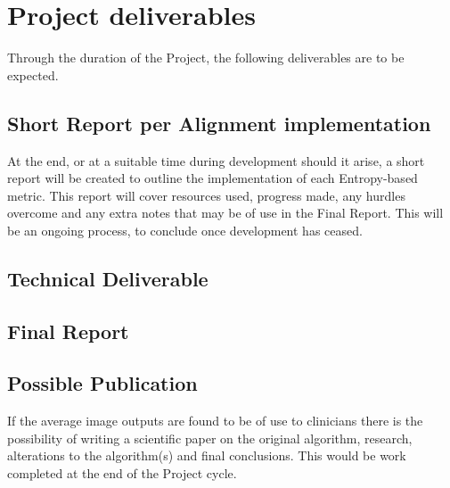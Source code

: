 \documentclass[11pt,fleqn,twoside]{article}
\begin{document}
\section{Project deliverables}
Through the duration of the Project, the following deliverables are to be expected.

\subsection{Short Report per Alignment implementation}
At the end, or at a suitable time during development should it arise, a short report will be created to outline the implementation of each Entropy-based metric. This report will cover resources used, progress made, any hurdles overcome and any extra notes that may be of use in the Final Report. This will be an ongoing process,  to conclude once development has ceased.

\subsection{Technical Deliverable}

\subsection{Final Report}

\subsection{Possible Publication}
If the average image outputs are found to be of use to clinicians there is the possibility of writing a scientific paper on the original algorithm, research, alterations to the algorithm(s) and final conclusions. This would be work completed at the end of the Project cycle.

\nocite{*} %

\newpage
{}

%
%

\renewcommand{\refname}{Annotated Bibliography}  %
\end{document}
